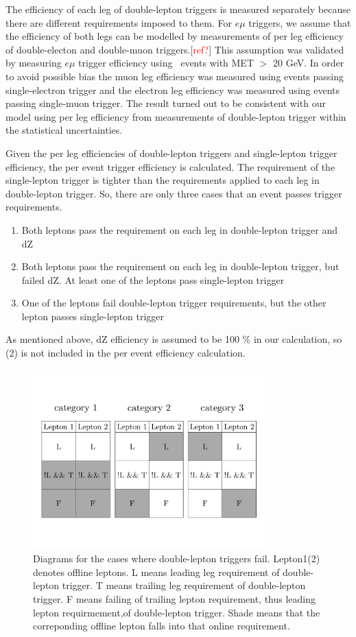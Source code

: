 The efficiency of each leg of double-lepton triggers is measured separately 
because there are different requirements imposed to them. For $e\mu$ triggers, 
we assume that the efficiency of both legs can be modelled by measurements 
of per leg efficiency of double-electon and double-muon triggers.[\textcolor{red}{ref?}] 
This assumption was validated by measuring $e\mu$ trigger efficiency 
using \Top\Atop~events with MET $>$ 20 GeV. In order to avoid possible bias
the muon leg efficiency was measured using events passing single-electron trigger
and the electron leg efficiency was measured using events passing single-muon trigger.
The result turned out to be consistent with our model using per leg efficiency
from measurements of double-lepton trigger within the statistical uncertainties. 

Given the per leg efficiencies of double-lepton triggers and single-lepton trigger 
efficiency, the per event trigger efficiency is calculated. The requirement of the 
single-lepton trigger is tighter than the requirements applied to each leg in 
double-lepton trigger. 
So, there are only three cases that an event passes trigger requirements. 
\begin{enumerate}
\item Both leptons pass the requirement on each leg in double-lepton trigger and dZ 
\item Both leptons pass the requirement on each leg in double-lepton trigger, but failed dZ. 
      At least one of the leptons pass single-lepton trigger 
\item One of the leptons fail double-lepton trigger requirements, but the 
      other lepton passes single-lepton trigger
\end{enumerate}
As mentioned above, dZ efficiency is assumed to be 100 \% in our calculation, 
so (2) is not included in the per event efficiency calculation.  
\begin{figure}[t]
\centering
\includegraphics[width=0.8\textwidth]{figures/TriggerEfficiencyDiagram.pdf}
\caption{ Diagrams for the cases where double-lepton triggers fail. Lepton1(2) 
denotes offline leptons. L means leading leg requirement of double-lepton trigger. 
T means trailing leg requirement of double-lepton trigger. F means failing of 
trailing lepton requirement, thus leading lepton requirmement,of double-lepton trigger.
Shade means that the correponding offline lepton falls into that online requirement.}
\label{fig:trg_eff_diagram}
\end{figure}
